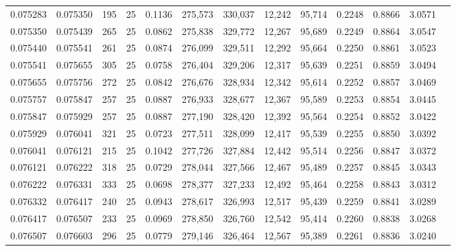 \begin{tabular}{rrrrrrrrrrrrr}
0.075283 & 0.075350 &   195 &  25 &                                     0.1136 & 275,573 & 330,037 &  12,242 &  95,714 & 0.2248 & 0.8866 & 3.0571 \\
0.075350 & 0.075439 &   265 &  25 &                                     0.0862 & 275,838 & 329,772 &  12,267 &  95,689 & 0.2249 & 0.8864 & 3.0547 \\
0.075440 & 0.075541 &   261 &  25 &                                     0.0874 & 276,099 & 329,511 &  12,292 &  95,664 & 0.2250 & 0.8861 & 3.0523 \\
0.075541 & 0.075655 &   305 &  25 &                                     0.0758 & 276,404 & 329,206 &  12,317 &  95,639 & 0.2251 & 0.8859 & 3.0494 \\
0.075655 & 0.075756 &   272 &  25 &                                     0.0842 & 276,676 & 328,934 &  12,342 &  95,614 & 0.2252 & 0.8857 & 3.0469 \\
0.075757 & 0.075847 &   257 &  25 &                                     0.0887 & 276,933 & 328,677 &  12,367 &  95,589 & 0.2253 & 0.8854 & 3.0445 \\
0.075847 & 0.075929 &   257 &  25 &                                     0.0887 & 277,190 & 328,420 &  12,392 &  95,564 & 0.2254 & 0.8852 & 3.0422 \\
0.075929 & 0.076041 &   321 &  25 &                                     0.0723 & 277,511 & 328,099 &  12,417 &  95,539 & 0.2255 & 0.8850 & 3.0392 \\
0.076041 & 0.076121 &   215 &  25 &                                     0.1042 & 277,726 & 327,884 &  12,442 &  95,514 & 0.2256 & 0.8847 & 3.0372 \\
0.076121 & 0.076222 &   318 &  25 &                                     0.0729 & 278,044 & 327,566 &  12,467 &  95,489 & 0.2257 & 0.8845 & 3.0343 \\
0.076222 & 0.076331 &   333 &  25 &                                     0.0698 & 278,377 & 327,233 &  12,492 &  95,464 & 0.2258 & 0.8843 & 3.0312 \\
0.076332 & 0.076417 &   240 &  25 &                                     0.0943 & 278,617 & 326,993 &  12,517 &  95,439 & 0.2259 & 0.8841 & 3.0289 \\
0.076417 & 0.076507 &   233 &  25 &                                     0.0969 & 278,850 & 326,760 &  12,542 &  95,414 & 0.2260 & 0.8838 & 3.0268 \\
0.076507 & 0.076603 &   296 &  25 &                                     0.0779 & 279,146 & 326,464 &  12,567 &  95,389 & 0.2261 & 0.8836 & 3.0240 \\

\end{tabular}
